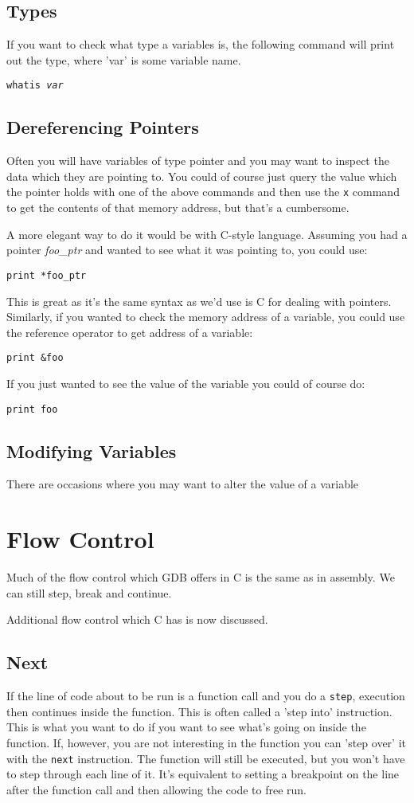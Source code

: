 \subsection{Types}
If you want to check what type a variables is, the following command will print out the type, where 'var' is some variable name.

\texttt{whatis \textit{var}}

\subsection{Dereferencing Pointers}
Often you will have variables of type pointer and you may want to inspect the data which they are pointing to. 
You could of course just query the value which the pointer holds with one of the above commands and then use the \texttt{x} command to get the contents of that memory address, but that's a cumbersome. 

A more elegant way to do it would be with C-style language. Assuming you had a pointer \textit{foo\_ptr} and wanted to see what it was pointing to, you could use:

\texttt{print *foo\_ptr}

This is great as it's the same syntax as we'd use is C for dealing with pointers. Similarly, if you wanted to check the memory address of a variable, you could use the reference operator to get address of a variable:

\texttt{print \&foo}

If you just wanted to see the value of the variable you could of course do:

\texttt{print foo}

\subsection{Modifying Variables}
There are occasions where you may want to alter the value of a variable

\section{Flow Control}
Much of the flow control which GDB offers in C is the same as in assembly. We can still step, break and continue.

Additional flow control which C has is now discussed.

\subsection{Next}
If the line of code about to be run is a function call and you do a \texttt{step}, execution then continues inside the function. This is often called a 'step into' instruction. This is what you want to do if you want to see what's going on inside the function.  If, however, you are not interesting in the function you can 'step over' it with the \texttt{next} instruction. The function will still be executed, but you won't have to step through each line of it. It's equivalent to setting a breakpoint on the line after the function call and then allowing the code to free run.

